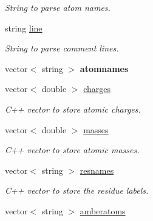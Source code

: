 \begin{DoxyCompactItemize}
\begin{DoxyCompactList}\small\item\em String to parse atom names. \item\end{DoxyCompactList}\item 
\hypertarget{classPRMTOP_afb253672cc1cb930fd9c082602865faa}{
string \hyperlink{classPRMTOP_afb253672cc1cb930fd9c082602865faa}{line}}
\label{classPRMTOP_afb253672cc1cb930fd9c082602865faa}

\begin{DoxyCompactList}\small\item\em String to parse comment lines. \item\end{DoxyCompactList}\item 
\hypertarget{classPRMTOP_afac097c4e7f91d921a9032ac7706c4d9}{
vector$<$ string $>$ {\bfseries atomnames}}
\label{classPRMTOP_afac097c4e7f91d921a9032ac7706c4d9}

\item 
\hypertarget{classPRMTOP_aa6db8463ce47125e481b24c9a5326da1}{
vector$<$ double $>$ \hyperlink{classPRMTOP_aa6db8463ce47125e481b24c9a5326da1}{charges}}
\label{classPRMTOP_aa6db8463ce47125e481b24c9a5326da1}

\begin{DoxyCompactList}\small\item\em C++ vector to store atomic charges. \item\end{DoxyCompactList}\item 
\hypertarget{classPRMTOP_a77af00256f2f4bd10b651e14c2389b2c}{
vector$<$ double $>$ \hyperlink{classPRMTOP_a77af00256f2f4bd10b651e14c2389b2c}{masses}}
\label{classPRMTOP_a77af00256f2f4bd10b651e14c2389b2c}

\begin{DoxyCompactList}\small\item\em C++ vector to store atomic masses. \item\end{DoxyCompactList}\item 
\hypertarget{classPRMTOP_a32ac8c887a12390780562c9a49e1fe6a}{
vector$<$ string $>$ \hyperlink{classPRMTOP_a32ac8c887a12390780562c9a49e1fe6a}{resnames}}
\label{classPRMTOP_a32ac8c887a12390780562c9a49e1fe6a}

\begin{DoxyCompactList}\small\item\em C++ vector to store the residue labels. \item\end{DoxyCompactList}\item 
\hypertarget{classPRMTOP_a227b954c56ca7d19a11369fedec7ace2}{
vector$<$ string $>$ \hyperlink{classPRMTOP_a227b954c56ca7d19a11369fedec7ace2}{amberatoms}}
\label{classPRMTOP_a227b954c56ca7d19a11369fedec7ace2}


\end{DoxyCompactItemize}
